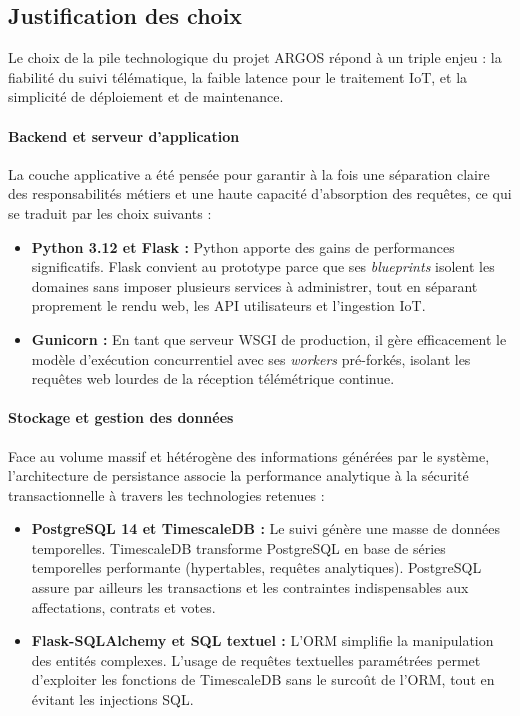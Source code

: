 \subsection{Justification des choix}

Le choix de la pile technologique du projet ARGOS répond à un triple enjeu : la fiabilité du suivi télématique, la faible latence pour le traitement IoT, et la simplicité de déploiement et de maintenance.

\paragraph{Backend et serveur d'application}
La couche applicative a été pensée pour garantir à la fois une séparation claire des responsabilités métiers et une haute capacité d'absorption des requêtes, ce qui se traduit par les choix suivants :
\begin{itemize}
    \item \textbf{Python 3.12 et Flask :} Python apporte des gains de performances significatifs. Flask convient au prototype parce que ses \emph{blueprints} isolent les domaines sans imposer plusieurs services à administrer, tout en séparant proprement le rendu web, les API utilisateurs et l'ingestion IoT\cite{flask}.
    \item \textbf{Gunicorn :} En tant que serveur WSGI de production, il gère efficacement le modèle d'exécution concurrentiel avec ses \emph{workers} pré-forkés, isolant les requêtes web lourdes de la réception télémétrique continue.
\end{itemize}

\paragraph{Stockage et gestion des données}
Face au volume massif et hétérogène des informations générées par le système, l'architecture de persistance associe la performance analytique à la sécurité transactionnelle à travers les technologies retenues :
\begin{itemize}
    \item \textbf{PostgreSQL 14 et TimescaleDB :} Le suivi génère une masse de données temporelles. TimescaleDB transforme PostgreSQL en base de séries temporelles performante (hypertables, requêtes analytiques). PostgreSQL assure par ailleurs les transactions et les contraintes indispensables aux affectations, contrats et votes\cite{postgresql}.
    \item \textbf{Flask-SQLAlchemy et SQL textuel :} L'ORM simplifie la manipulation des entités complexes. L'usage de requêtes textuelles paramétrées permet d'exploiter les fonctions de TimescaleDB sans le surcoût de l'ORM, tout en évitant les injections SQL.
\end{itemize}

